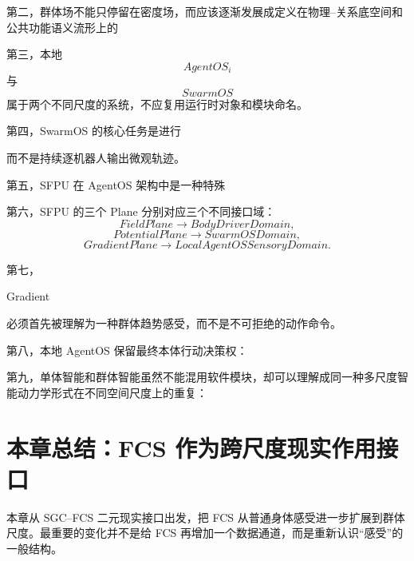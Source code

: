 第二，群体场不能只停留在密度场，而应该逐渐发展成定义在物理--关系底空间和公共功能语义流形上的
\begin{statementbox}
\centering
{}
\end{statementbox}

第三，本地
\[
AgentOS_i
\]
与
\[
SwarmOS
\]
属于两个不同尺度的系统，不应复用运行时对象和模块命名。

第四，SwarmOS 的核心任务是进行
\begin{statementbox}
\centering
{}
\end{statementbox}
而不是持续逐机器人输出微观轨迹。

第五，SFPU 在 AgentOS 架构中是一种特殊
\begin{statementbox}
\centering
{}
\end{statementbox}

第六，SFPU 的三个 Plane 分别对应三个不同接口域：
\[
FieldPlane
\rightarrow
BodyDriverDomain,
\]
\[
PotentialPlane
\rightarrow
SwarmOSDomain,
\]
\[
GradientPlane
\rightarrow
LocalAgentOSSensoryDomain.
\]

第七，
\begin{statementbox}
Gradient
\end{statementbox}
必须首先被理解为一种群体趋势感受，而不是不可拒绝的动作命令。

第八，本地 AgentOS 保留最终本体行动决策权：
\begin{statementbox}
\centering
{}
\end{statementbox}

第九，单体智能和群体智能虽然不能混用软件模块，却可以理解成同一种多尺度智能动力学形式在不同空间尺度上的重复：
\begin{statementbox}
\centering
{}
\end{statementbox}


\section{本章总结：FCS 作为跨尺度现实作用接口}

本章从 SGC--FCS 二元现实接口出发，把 FCS 从普通身体感受进一步扩展到群体尺度。最重要的变化并不是给 FCS 再增加一个数据通道，而是重新认识“感受”的一般结构。

